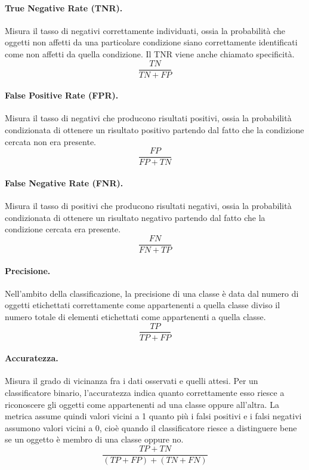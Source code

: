 \documentclass[12pt]{article}
\begin{document}
\paragraph{True Negative Rate (TNR).} Misura il tasso di negativi correttamente individuati, ossia la probabilità che oggetti non affetti da una particolare condizione siano correttamente identificati come non affetti da quella condizione. Il TNR viene anche chiamato specificità.
\[ \frac{TN}{TN+FP} \]
\paragraph{False Positive Rate (FPR).} Misura il tasso di negativi che producono risultati positivi, ossia la probabilità condizionata di ottenere un risultato positivo partendo dal fatto che la condizione cercata non era presente.
\[ \frac{FP}{FP+TN} \]
\paragraph{False Negative Rate (FNR).} Misura il tasso di positivi che producono risultati negativi, ossia la probabilità condizionata di ottenere un risultato negativo partendo dal fatto che la condizione cercata era presente.
\[ \frac{FN}{FN+TP} \]
\paragraph{Precisione.} Nell'ambito della classificazione, la precisione di una classe è data dal numero di oggetti etichettati correttamente come appartenenti a quella classe diviso il numero totale di elementi etichettati come appartenenti a quella classe.
\[ \frac{TP}{TP+FP} \]
\paragraph{Accuratezza.} Misura il grado di vicinanza fra i dati osservati e quelli attesi. Per un classificatore binario, l'accuratezza indica quanto correttamente esso riesce a riconoscere gli oggetti come appartenenti ad una classe oppure all'altra. La metrica assume quindi valori vicini a 1 quanto più i falsi positivi e i falsi negativi assumono valori vicini a 0, cioè quando il classificatore riesce a distinguere bene se un oggetto è membro di una classe oppure no.
\[ \frac{TP+TN}{(TP+FP)+(TN+FN)} \]
\end{document}
